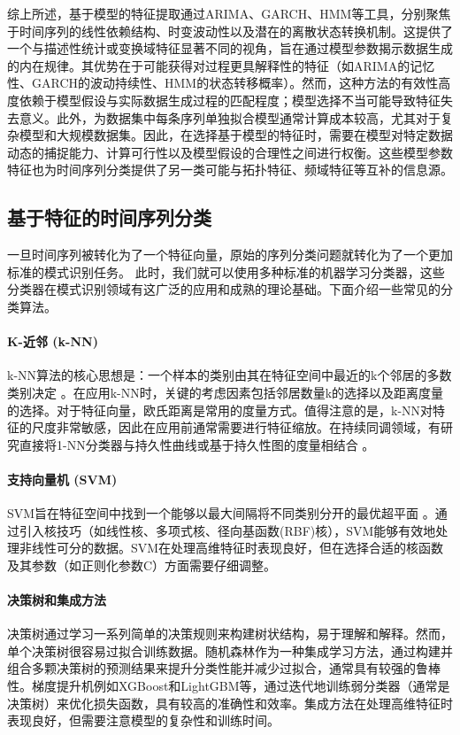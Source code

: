 综上所述，基于模型的特征提取通过ARIMA、GARCH、HMM等工具，分别聚焦于时间序列的线性依赖结构、时变波动性以及潜在的离散状态转换机制。这提供了一个与描述性统计或变换域特征显著不同的视角，旨在通过模型参数揭示数据生成的内在规律。其优势在于可能获得对过程更具解释性的特征（如ARIMA的记忆性、GARCH的波动持续性、HMM的状态转移概率）。然而，这种方法的有效性高度依赖于模型假设与实际数据生成过程的匹配程度；模型选择不当可能导致特征失去意义。此外，为数据集中每条序列单独拟合模型通常计算成本较高，尤其对于复杂模型和大规模数据集。因此，在选择基于模型的特征时，需要在模型对特定数据动态的捕捉能力、计算可行性以及模型假设的合理性之间进行权衡。这些模型参数特征也为时间序列分类提供了另一类可能与拓扑特征、频域特征等互补的信息源。




\subsection{基于特征的时间序列分类}
一旦时间序列被转化为了一个特征向量，原始的序列分类问题就转化为了一个更加标准的模式识别任务。
此时，我们就可以使用多种标准的机器学习分类器，这些分类器在模式识别领域有这广泛的应用和成熟的理论基础。下面介绍一些常见的分类算法。

\paragraph*{K-近邻 (k-NN)}
k-NN算法的核心思想是：一个样本的类别由其在特征空间中最近的k个邻居的多数类别决定 。在应用k-NN时，关键的考虑因素包括邻居数量k的选择以及距离度量的选择。对于特征向量，欧氏距离是常用的度量方式。值得注意的是，k-NN对特征的尺度非常敏感，因此在应用前通常需要进行特征缩放。在持续同调领域，有研究直接将1-NN分类器与持久性曲线或基于持久性图的度量相结合 。\cite{susto2018time}

\paragraph*{支持向量机 (SVM)}
SVM旨在特征空间中找到一个能够以最大间隔将不同类别分开的最优超平面 。通过引入核技巧（如线性核、多项式核、径向基函数(RBF)核），SVM能够有效地处理非线性可分的数据。SVM在处理高维特征时表现良好，但在选择合适的核函数及其参数（如正则化参数C）方面需要仔细调整。
\cite{de2023persistent}

\paragraph*{决策树和集成方法}
决策树通过学习一系列简单的决策规则来构建树状结构，易于理解和解释。然而，单个决策树很容易过拟合训练数据。随机森林作为一种集成学习方法，通过构建并组合多颗决策树的预测结果来提升分类性能并减少过拟合，通常具有较强的鲁棒性。梯度提升机例如XGBoost和LightGBM等，通过迭代地训练弱分类器（通常是决策树）来优化损失函数，具有较高的准确性和效率。集成方法在处理高维特征时表现良好，但需要注意模型的复杂性和训练时间。

